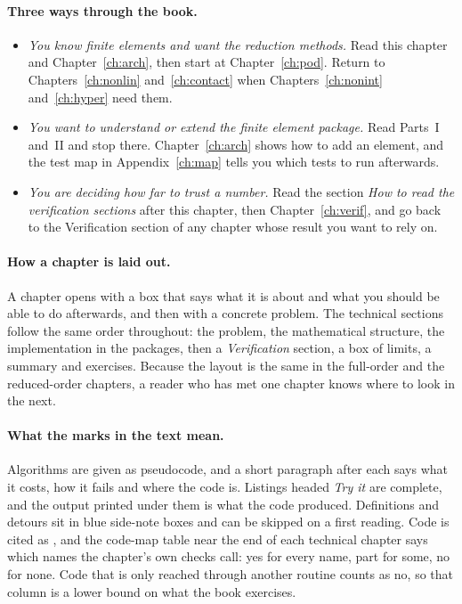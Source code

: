 \paragraph{Three ways through the book.}
\begin{itemize}
\item \emph{You know finite elements and want the reduction methods.} Read this chapter and Chapter~\ref{ch:arch}, then start at Chapter~\ref{ch:pod}. Return to Chapters~\ref{ch:nonlin} and~\ref{ch:contact} when Chapters~\ref{ch:nonint} and~\ref{ch:hyper} need them.
\item \emph{You want to understand or extend the finite element package.} Read Parts~I and~II and stop there. Chapter~\ref{ch:arch} shows how to add an element, and the test map in Appendix~\ref{ch:map} tells you which tests to run afterwards.
\item \emph{You are deciding how far to trust a number.} Read the section \emph{How to read the verification sections} after this chapter, then Chapter~\ref{ch:verif}, and go back to the Verification section of any chapter whose result you want to rely on.
\end{itemize}

\paragraph{How a chapter is laid out.} A chapter opens with a box that says what it is about and what you should be able to do afterwards, and then with a concrete problem. The technical sections follow the same order throughout: the problem, the mathematical structure, the implementation in the packages, then a \emph{Verification} section, a box of limits, a summary and exercises. Because the layout is the same in the full-order and the reduced-order chapters, a reader who has met one chapter knows where to look in the next.

\paragraph{What the marks in the text mean.} Algorithms are given as pseudocode, and a short paragraph after each says what it costs, how it fails and where the code is. Listings headed \emph{Try it} are complete, and the output printed under them is what the code produced. Definitions and detours sit in blue side-note boxes and can be skipped on a first reading. Code is cited as , and the code-map table near the end of each technical chapter says which names the chapter's own checks call: yes for every name, part for some, no for none. Code that is only reached through another routine counts as no, so that column is a lower bound on what the book exercises.
